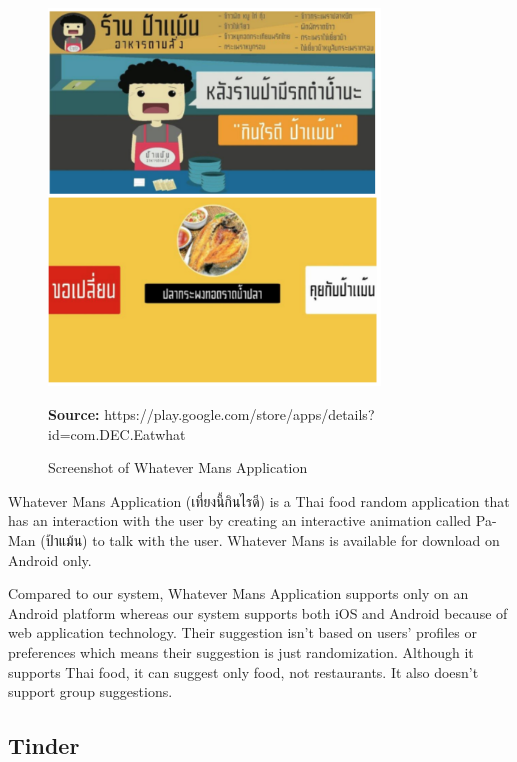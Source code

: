\documentclass[12pt,oneside,openright,a4paper]{cpe-english-project}
\newcommand*{\captionsource}[2]{%
  \caption[{#1}]{#1}\vspace{-8pt}
  \textbf{Source:} #2}
\begin{document}
\begin{figure}[H]\centering
\includegraphics[width=250pt]{./images/2whatman.png}
\label{fig:2whatman}
\captionsource{Screenshot of Whatever Mans Application}{https://play.google.com/store/apps/details?id=com.DEC.Eatwhat}
\end{figure}\vspace{-24pt}
\vspace{1em}

Whatever Mans Application  ({\thaifont เที่ยงนี้กินไรดี}) is a Thai food random application that has an interaction with the user by creating an interactive animation called Pa-Man ({\thaifont ป้าแม้น}) to talk with the user. \cite{Whatevermans} Whatever Mans is available for download on Android only.

Compared to our system, Whatever Mans Application supports only on an Android platform whereas our system supports both iOS and Android because of web application technology. Their suggestion isn't based on users’ profiles or preferences which means their suggestion is just randomization. Although it supports Thai food, it can suggest only food, not restaurants. It also doesn’t support group suggestions.

\newpage
\subsection{Tinder}
\end{document}
